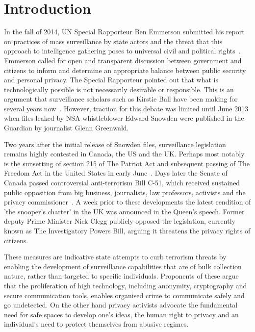 \documentclass{llncs}
\begin{document}
\section{Introduction}
\label{sec:Introduction}
In the fall of 2014, UN Special Rapporteur Ben Emmerson submitted his report on practices of mass surveillance by state actors and the threat that this approach to intelligence gathering poses to universal civil and political rights~\cite{Emerson}. Emmerson called for open and transparent discussion between government and citizens to inform and determine an appropriate balance between public security and personal privacy. The Special Rapporteur pointed out that what is technologically possible is not necessarily desirable or responsible. This is an argument that surveillance scholars such as Kirstie Ball have been making for several years now~\cite{Ball}. However, traction for this debate was limited until June 2013 when files leaked by NSA whistleblower Edward Snowden were published in the Guardian by journalist Glenn Greenwald. 

Two years after the initial release of Snowden files, surveillance legislation remains highly contested in Canada, the US and the UK. Perhaps most notably is the sunsetting of section 215 of The Patriot Act and subsequent passing of The Freedom Act in the United States in early June~\cite{Patriot}. Days later the Senate of Canada passed controversial anti-terrorism Bill C-51, which received sustained public opposition from big business, journalists, law professors, activists and the privacy commissioner~\cite{C-51}. A week prior to these developments the latest rendition of ’the snooper’s charter’ in the UK was announced in the Queen’s speech. Former deputy Prime Minister Nick Clegg publicly opposed the legislation, currently known as The Investigatory Powers Bill, arguing it threatens the privacy rights of citizens.  

These measures are indicative state attempts to curb terrorism threats by enabling the development of surveillance capabilities that are of bulk collection nature, rather than targeted to specific individuals. Proponents of these argue that the proliferation of high technology, including anonymity, cryptography and secure communication tools, enables organised crime to communicate safely and go undetected. On the other hand privacy activists advocate the fundamental need for safe spaces to develop one's ideas, the human right to privacy and an individual's need to protect themselves from abusive regimes.
\end{document}
